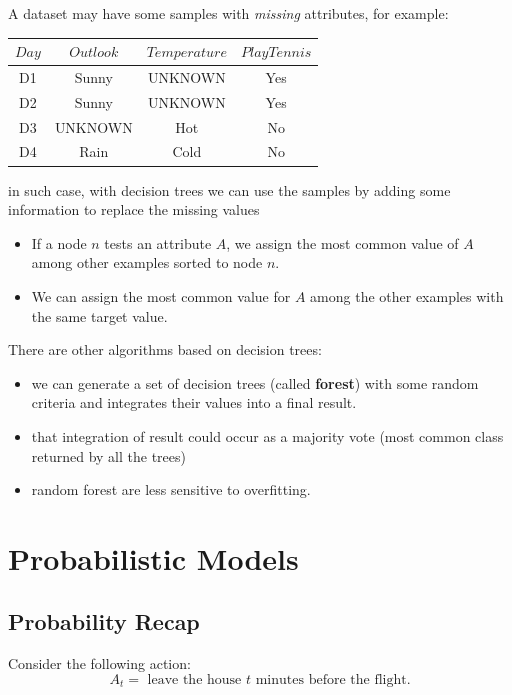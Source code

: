 \documentclass[10pt, letterpaper]{report}
\begin{document}
A dataset may have some samples with \textit{missing} attributes, for example:
\begin{center}
	\begin{tabular}{|c|c|c|c|}
		\hline
		{$Day$} & {$Outlook$} & {$Temperature$} & {$PlayTennis$} \\
		\hline
		D1      & Sunny       & UNKNOWN         & Yes            \\
		\hline
		D2      & Sunny       & UNKNOWN         & Yes            \\
		\hline
		D3      & UNKNOWN     & Hot             & No             \\
		\hline
		D4      & Rain        & Cold            & No             \\
		\hline
	\end{tabular}
\end{center}
in such case, with decision trees we can use the samples by adding some information to replace the missing values\begin{itemize}
	\item If a node $n$ tests an attribute $A$, we assign the most common value of $A$ among other examples sorted to node $n$.
	\item We can assign the most common value for $A$ among the other examples with the same target value.
\end{itemize}

\bigskip
There are other algorithms based on decision trees:\begin{itemize}
	\item we can generate a set of decision trees (called \textbf{forest}) with some random criteria and integrates their values into a final result.
	\item that integration of result could occur as a majority vote (most common class returned by all the trees)
	\item random forest are less sensitive to overfitting.
\end{itemize}

\chapter{Probabilistic Models}

\section{Probability Recap}

Consider the following action:
\begin{equation}
	A_t = \text{ leave the house $t$ minutes before the flight.}
\end{equation}
\end{document}
